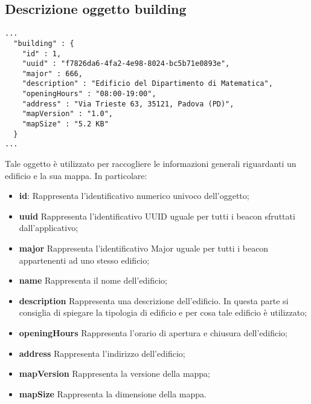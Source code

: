 \documentclass[../ManualeSviluppatore.tex]{subfiles}
\begin{document}
	\subsection{Descrizione oggetto building}
		\begin{lstlisting}
...
  "building" : {
    "id" : 1,
    "uuid" : "f7826da6-4fa2-4e98-8024-bc5b71e0893e",
    "major" : 666,
    "description" : "Edificio del Dipartimento di Matematica",
    "openingHours" : "08:00-19:00",
    "address" : "Via Trieste 63, 35121, Padova (PD)",
    "mapVersion" : "1.0",
    "mapSize" : "5.2 KB"
  }
...
		\end{lstlisting}
		Tale oggetto è utilizzato per raccogliere le informazioni generali riguardanti un edificio e la sua mappa. In particolare:
		\begin{itemize}
			\item \textbf{id}: Rappresenta l'identificativo numerico univoco dell'oggetto;
			\item \textbf{uuid} Rappresenta l'identificativo UUID uguale per tutti i beacon sfruttati dall'applicativo;
			\item \textbf{major} Rappresenta l'identificativo Major uguale per tutti i beacon appartenenti ad uno stesso edificio;
			\item \textbf{name} Rappresenta il nome dell'edificio;
			\item \textbf{description} Rappresenta una descrizione dell'edificio. In questa parte si consiglia di spiegare la tipologia di edificio e per cosa tale edificio è utilizzato;
			\item \textbf{openingHours} Rappresenta l'orario di apertura e chiusura dell'edificio;
			\item \textbf{address} Rappresenta l'indirizzo dell'edificio;
			\item \textbf{mapVersion} Rappresenta la versione della mappa;
			\item \textbf{mapSize} Rappresenta la dimensione della mappa.
		\end{itemize} 
\end{document}
